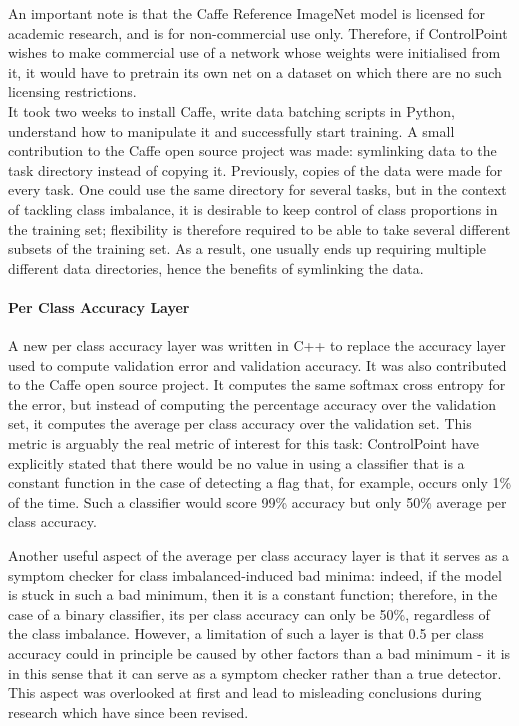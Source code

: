 \documentclass[a4paper,11pt]{article}
\begin{document}
An important note is that the Caffe Reference ImageNet model is licensed for academic research, and is for non-commercial use only. Therefore, if ControlPoint wishes to make commercial use of a network whose weights were initialised from it, it would have to pretrain its own net on a dataset on which there are no such licensing restrictions. \\

It took two weeks to install Caffe, write data batching scripts in Python, understand how to manipulate it and successfully start training. A small contribution to the Caffe open source project was made: symlinking data to the task directory instead of copying it. Previously, copies of the data were made for every task. One could use the same directory for several tasks, but in the context of tackling class imbalance, it is desirable to keep control of class proportions in the training set; flexibility is therefore required to be able to take several different subsets of the training set. As a result, one usually ends up requiring multiple different data directories, hence the benefits of symlinking the data. 


\paragraph{Per Class Accuracy Layer}

A new per class accuracy layer was written in C++ to replace the accuracy layer used to compute validation error and validation accuracy. It was also contributed to the Caffe open source project. It computes the same softmax cross entropy for the error, but instead of computing the percentage accuracy over the validation set, it computes the average per class accuracy over the validation set. This metric is arguably the real metric of interest for this task: ControlPoint have explicitly stated that there would be no value in using a classifier that is a constant function in the case of detecting a flag that, for example, occurs only 1\% of the time. Such a classifier would score 99\% accuracy but only 50\% average per class accuracy.

Another useful aspect of the average per class accuracy layer is that it serves as a symptom checker for class imbalanced-induced bad minima: indeed, if the model is stuck in such a bad minimum, then it is a constant function; therefore, in the case of a binary classifier, its per class accuracy can only be 50\%, regardless of the class imbalance. However, a limitation of such a layer is that 0.5 per class accuracy could in principle be caused by other factors than a bad minimum - it is in this sense that it can serve as a symptom checker rather than a true detector. This aspect was overlooked at first and lead to misleading conclusions during research which have since been revised. 
\end{document}
